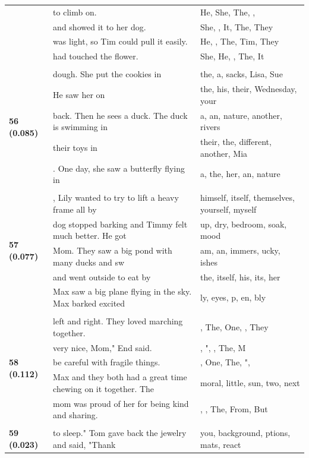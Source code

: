 \documentclass{article}
\theoremstyle{plain}
\theoremstyle{definition}
\theoremstyle{remark}
\begin{document}
\begin{longtable}{|p{}|p{}|p{}|}
& to climb on. & He,  She,  The,  , \\
& and showed it to her dog. & She,  ,  It,  The,  They \\
& was light, so Tim could pull it easily. & He,  ,  The,  Tim,  They \\
& had touched the flower. & She,  He,   ,  The,  It \\
& & \\
\multirow{5}{*}{\textbf{56 (0.085)}} & dough. She put the cookies in & the,  a,  sacks,  Lisa,  Sue \\
& He saw her on & the,  his,  their,  Wednesday,  your \\
& back.  Then he sees a duck. The duck is swimming in & a,  an,  nature,  another,  rivers \\
& their toys in & their,  the,  different,  another,  Mia \\
& . One day, she saw a butterfly flying in & a,  the,  her,  an,  nature \\
& & \\
\multirow{5}{*}{\textbf{57 (0.077)}} & , Lily wanted to try to lift a heavy frame all by & himself,  itself,  themselves,  yourself,  myself \\
& dog stopped barking and Timmy felt much better. He got & up,  dry,  bedroom,  soak,  mood \\
& Mom. They saw a big pond with many ducks and sw & am, an, immers, ucky, ishes \\
& and went outside to eat by & the,  itself,  his,  its,  her \\
& Max saw a big plane flying in the sky.  Max barked excited & ly,  eyes,  p, en, bly \\
& & \\
\multirow{5}{*}{\textbf{58 (0.112)}} & left and right. They loved marching together. & , The, One,  , They \\
& very nice, Mom," End said. & , ",  , The, M \\
& be careful with fragile things. & , One, The, ", \\
& Max and they both had a great time chewing on it together. The & moral,  little,  sun,  two,  next \\
& mom was proud of her for being kind and sharing. & ,  , The, From, But \\
& & \\
\multirow{5}{*}{\textbf{59 (0.023)}} & to sleep." Tom gave back the jewelry and said, "Thank & you,  background, ptions,  mats,  react \\

\end{longtable}
\end{document}
